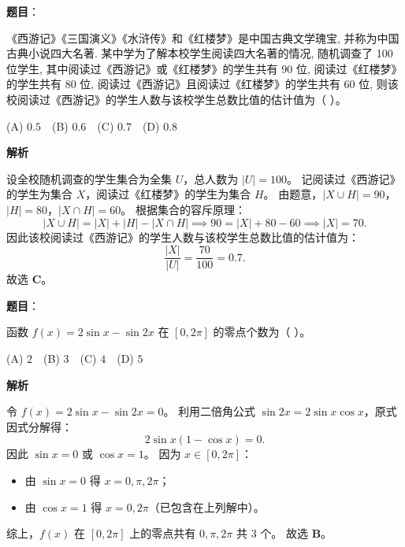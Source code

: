 \begin{answer}

\textbf{题目}：

《西游记》《三国演义》《水浒传》和《红楼梦》是中国古典文学瑰宝, 并称为中国古典小说四大名著. 某中学为了解本校学生阅读四大名著的情况, 随机调查了 100 位学生, 其中阅读过《西游记》或《红楼梦》的学生共有 90 位, 阅读过《红楼梦》的学生共有 80 位, 阅读过《西游记》且阅读过《红楼梦》的学生共有 60 位, 则该校阅读过《西游记》的学生人数与该校学生总数比值的估计值为（ ）。

(A) $0.5$　(B) $0.6$　(C) $0.7$　(D) $0.8$

\textbf{解析}

设全校随机调查的学生集合为全集 $U$，总人数为 $|U| = 100$。
记阅读过《西游记》的学生为集合 $X$，阅读过《红楼梦》的学生为集合 $H$。
由题意，$|X \cup H| = 90$，$|H| = 80$，$|X \cap H| = 60$。
根据集合的容斥原理：
\nopagebreak[4]
\[|X \cup H| = |X| + |H| - |X \cap H| \implies 90 = |X| + 80 - 60 \implies |X| = 70.\]
因此该校阅读过《西游记》的学生人数与该校学生总数比值的估计值为：
\nopagebreak[4]
\[\frac{|X|}{|U|} = \frac{70}{100} = 0.7.\]
故选 \textbf{C}。


\end{answer}
\begin{answer}

\textbf{题目}：

函数 $f(x) = 2\sin x - \sin 2x$ 在 $[0, 2\pi]$ 的零点个数为（ ）。

(A) $2$　(B) $3$　(C) $4$　(D) $5$

\textbf{解析}

令 $f(x) = 2\sin x - \sin 2x = 0$。
利用二倍角公式 $\sin 2x = 2\sin x\cos x$，原式因式分解得：
\nopagebreak[4]
\[2\sin x(1 - \cos x) = 0.\]
因此 $\sin x = 0$ 或 $\cos x = 1$。
因为 $x \in [0, 2\pi]$：
\begin{itemize}
\item 由 $\sin x = 0$ 得 $x = 0, \pi, 2\pi$；
\item 由 $\cos x = 1$ 得 $x = 0, 2\pi$（已包含在上列解中）。
\end{itemize}
综上，$f(x)$ 在 $[0, 2\pi]$ 上的零点共有 $0, \pi, 2\pi$ 共 3 个。
故选 \textbf{B}。


\end{answer}
